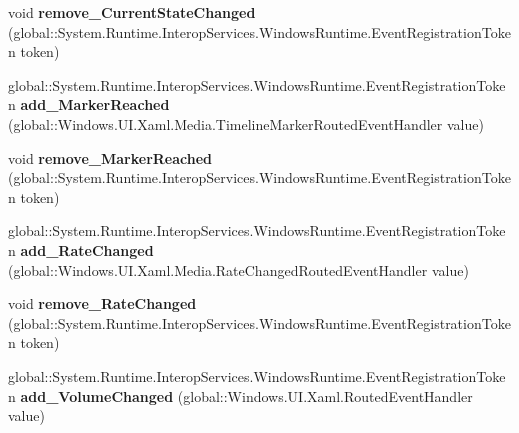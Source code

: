 \begin{DoxyCompactItemize}
void {\bfseries remove\+\_\+\+Current\+State\+Changed} (global\+::\+System.\+Runtime.\+Interop\+Services.\+Windows\+Runtime.\+Event\+Registration\+Token token)
\item 
\mbox{\label{interface_windows_1_1_u_i_1_1_xaml_1_1_controls_1_1_i_media_element_abe1f11754f86e35e5a3b093554c58043}} 
global\+::\+System.\+Runtime.\+Interop\+Services.\+Windows\+Runtime.\+Event\+Registration\+Token {\bfseries add\+\_\+\+Marker\+Reached} (global\+::\+Windows.\+U\+I.\+Xaml.\+Media.\+Timeline\+Marker\+Routed\+Event\+Handler value)
\item 
\mbox{\label{interface_windows_1_1_u_i_1_1_xaml_1_1_controls_1_1_i_media_element_a0238b7aba4ea8d50a18b11bbccde3c0c}} 
void {\bfseries remove\+\_\+\+Marker\+Reached} (global\+::\+System.\+Runtime.\+Interop\+Services.\+Windows\+Runtime.\+Event\+Registration\+Token token)
\item 
\mbox{\label{interface_windows_1_1_u_i_1_1_xaml_1_1_controls_1_1_i_media_element_afdb9ef8dc66f874e5bd722e80ec927bb}} 
global\+::\+System.\+Runtime.\+Interop\+Services.\+Windows\+Runtime.\+Event\+Registration\+Token {\bfseries add\+\_\+\+Rate\+Changed} (global\+::\+Windows.\+U\+I.\+Xaml.\+Media.\+Rate\+Changed\+Routed\+Event\+Handler value)
\item 
\mbox{\label{interface_windows_1_1_u_i_1_1_xaml_1_1_controls_1_1_i_media_element_a9e5266118a01c36612caa255627e769e}} 
void {\bfseries remove\+\_\+\+Rate\+Changed} (global\+::\+System.\+Runtime.\+Interop\+Services.\+Windows\+Runtime.\+Event\+Registration\+Token token)
\item 
\mbox{\label{interface_windows_1_1_u_i_1_1_xaml_1_1_controls_1_1_i_media_element_aedd52f355cd6b0ac289dab97618b03b2}} 
global\+::\+System.\+Runtime.\+Interop\+Services.\+Windows\+Runtime.\+Event\+Registration\+Token {\bfseries add\+\_\+\+Volume\+Changed} (global\+::\+Windows.\+U\+I.\+Xaml.\+Routed\+Event\+Handler value)
\item 
\mbox{\label{interface_windows_1_1_u_i_1_1_xaml_1_1_controls_1_1_i_media_element_a60f936214a2f097646cfe13f567cf130}} 

\end{DoxyCompactItemize}
